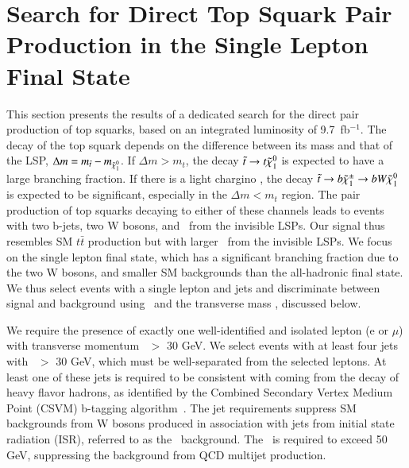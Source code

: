 \section{Search for Direct Top Squark Pair Production in the Single Lepton Final State}
\label{sec:stop}

This section presents the results of a dedicated search for the direct pair production of top squarks, based on an integrated luminosity of 9.7~fb$^{-1}$.
The decay of the top squark depends on the difference between its mass and that of the LSP,
$\Delta m = m_{\tilde{t}}-m_{\tilde{\chi}_{1}^{0}}$. If $\Delta m > m_{t}$, the decay $\tilde{t}\to t\tilde{\chi}_{1}^{0}$ is expected
to have a large branching fraction. If there is a light chargino \chip, the decay 
$\tilde{t}\to b\tilde{\chi}_{1}^{\pm}\to b W \tilde{\chi}_{1}^{0}$ is expected to be significant, especially in the $\Delta m < m_{t}$ region.
The pair production of top squarks decaying to either of these channels leads to events with two b-jets, two W bosons,
and \met\ from the invisible LSPs. Our signal thus resembles SM $t\bar{t}$ production but with larger \met\ from
the invisible LSPs.
We focus on the single lepton final state, which has a significant branching fraction due to the two W bosons,
and smaller SM backgrounds than the all-hadronic final state.
We thus select events with a single lepton and jets and discriminate between
signal and background using \met\ and the transverse mass \mt, discussed below.


We require the presence of exactly one well-identified and isolated lepton (e or $\mu$) with transverse
momentum \pt\ $>$ 30 GeV. 
We select events with at least four jets with \pt\ $>$ 30 GeV,
which must be well-separated from the selected leptons.
At least one of these jets is required to be consistent with coming from the decay of heavy flavor hadrons, as
identified by the Combined Secondary Vertex Medium Point (CSVM) b-tagging algorithm~\cite{ref:btag}.
The jet requirements suppress SM backgrounds from W bosons produced in association with jets from initial state
radiation (ISR), referred to as the \wjets\ background. 
The \met\ is required to exceed 50 GeV, suppressing the background from QCD multijet production.


